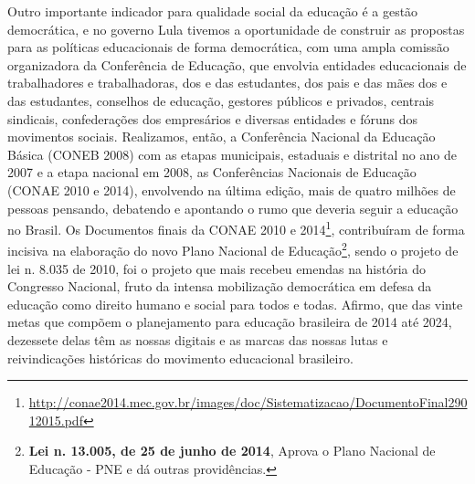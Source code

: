 Outro importante indicador para qualidade social da educação é a gestão
democrática, e no governo Lula tivemos a oportunidade de construir as
propostas para as políticas educacionais de forma democrática, com uma
ampla comissão organizadora da Conferência de Educação, que envolvia
entidades educacionais de trabalhadores e trabalhadoras, dos e das
estudantes, dos pais e das mães dos e das estudantes, conselhos de
educação, gestores públicos e privados, centrais sindicais,
confederações dos empresários e diversas entidades e fóruns dos
movimentos sociais. Realizamos, então, a Conferência Nacional da
Educação Básica (CONEB 2008) com as etapas municipais, estaduais e
distrital no ano de 2007 e a etapa nacional em 2008, as Conferências
Nacionais de Educação (CONAE 2010 e 2014), envolvendo na última edição,
mais de quatro milhões de pessoas pensando, debatendo e apontando o rumo
que deveria seguir a educação no Brasil. Os Documentos finais da CONAE
2010 e 2014\footnote{\url{http://conae2014.mec.gov.br/images/doc/Sistematizacao/DocumentoFinal29012015.pdf}},
contribuíram de forma incisiva na elaboração do novo Plano Nacional de
Educação\footnote{\textbf{Lei n. 13.005, de 25 de junho de 2014}, Aprova
  o Plano Nacional de Educação - PNE e dá outras providências.}, sendo o
projeto de lei n. 8.035 de 2010, foi o projeto que mais recebeu emendas
na história do Congresso Nacional, fruto da intensa mobilização
democrática em defesa da educação como direito humano e social para
todos e todas. Afirmo, que das vinte metas que compõem o planejamento
para educação brasileira de 2014 até 2024, dezessete delas têm as nossas
digitais e as marcas das nossas lutas e reivindicações históricas do
movimento educacional brasileiro.

